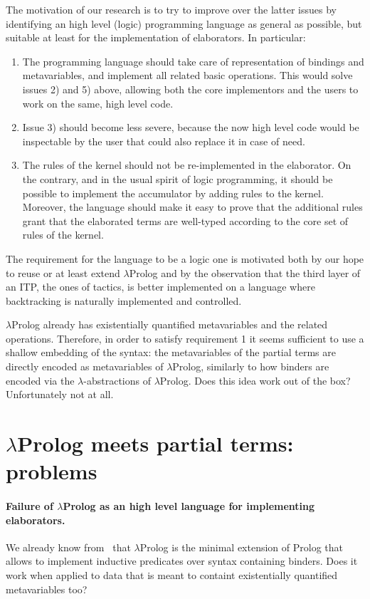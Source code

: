 \documentclass{easychair}
\begin{document}
The motivation of our research is to try to improve over the latter
issues by identifying an high level (logic) programming language as
general as possible, but suitable at least for the implementation of
elaborators. In particular:
\begin{enumerate}
\item The programming language should take care of representation of
	bindings and metavariables, and implement all related basic
	operations. This would solve issues 2) and 5) above, allowing
	both the core implementors and the users to work on the same,
	high level code.
\item Issue 3) should become less severe, because the now high level
	code would be inspectable by the user that could also replace
	it in case of need.
\item The rules of the kernel should not be re-implemented in the
	elaborator. On the contrary, and in the usual spirit of logic
	programming, it should be possible to implement the
	accumulator by adding rules to the kernel. Moreover, the
	language should make it easy to prove that the additional
	rules grant that the elaborated terms are well-typed according
	to the core set of rules of the kernel.
\end{enumerate}

The requirement for the language to be a logic one is motivated both
by our hope to reuse or at least extend $\lambda$Prolog and by the
observation that the third layer of an ITP, the ones of tactics, is
better implemented on a language where backtracking is naturally
implemented and controlled.

$\lambda$Prolog already has existentially quantified metavariables and the related operations. Therefore, in order to satisfy requirement 1 it seems sufficient to use a shallow embedding of the syntax: the metavariables of the partial terms are directly encoded as metavariables of $\lambda$Prolog, similarly to how binders are encoded via the $\lambda$-abstractions of $\lambda$Prolog. Does this idea work out of the box? Unfortunately not at all.

\section{$\lambda$Prolog meets partial terms: problems}


\paragraph{Failure of $\lambda$Prolog as an high level language for
implementing elaborators.}
We already know from~\cite{jlp98} that $\lambda$Prolog is the minimal
extension of Prolog that allows to implement inductive predicates over
syntax containing binders. Does it work when applied to data that is
meant to containt existentially quantified metavariables too?
\end{document}
